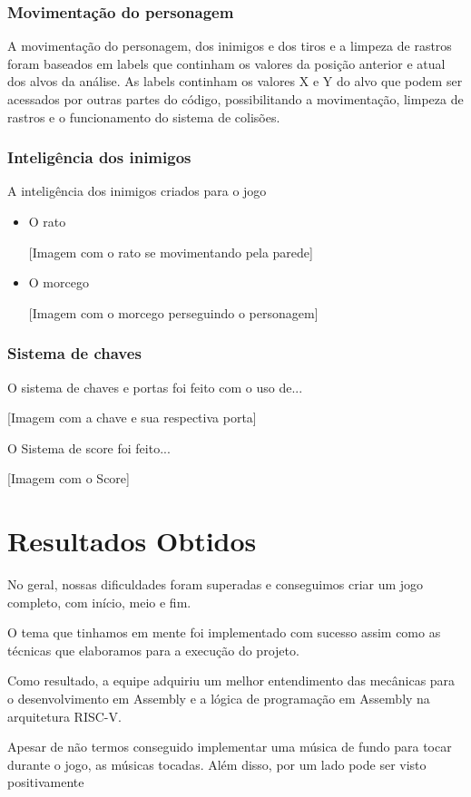\documentclass[conference]{IEEEtran}
\begin{document}
\subsubsection{Movimentação do personagem} 
  A movimentação do personagem, dos inimigos e dos tiros e a limpeza de rastros foram baseados em labels que continham  os valores da posição anterior e atual dos alvos da análise. As labels continham os valores X e Y do alvo que podem ser acessados por outras partes do código, possibilitando a movimentação, limpeza de rastros e o funcionamento do sistema de colisões.
  
\subsubsection{Inteligência dos inimigos} 
  A inteligência dos inimigos criados para o jogo
\begin{itemize}
  \item O rato
  
  [Imagem com o rato se movimentando pela parede]
  
  \item O morcego
  
  [Imagem com o morcego perseguindo o personagem]
\end{itemize}
 
\subsubsection{Sistema de chaves}  
O sistema de chaves e portas foi feito com o uso de...

[Imagem com a chave e sua respectiva porta]

O Sistema de score foi feito... 

[Imagem com o Score]

\section{Resultados Obtidos}
No geral, nossas dificuldades foram superadas e conseguimos criar um jogo completo, com início, meio e fim. 

O tema que tinhamos em mente foi implementado com sucesso assim como as técnicas que elaboramos para a execução do projeto. 

Como resultado, a equipe adquiriu um melhor entendimento das mecânicas para o desenvolvimento em Assembly e a lógica de programação em Assembly na arquitetura RISC-V.

Apesar de não termos conseguido implementar uma música de fundo para tocar durante o jogo, as músicas tocadas. Além disso, por um lado pode ser visto positivamente 
\end{document}
